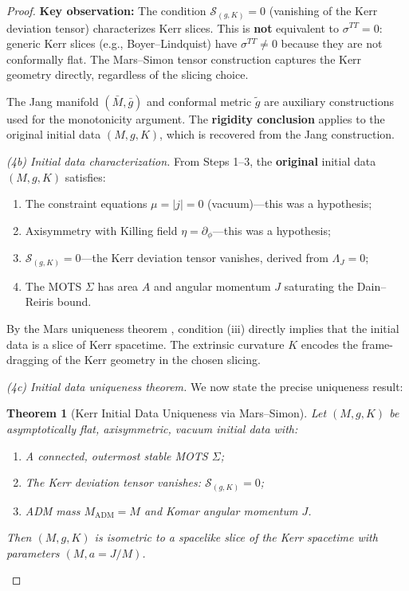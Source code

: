 \documentclass[12pt]{article}
\theoremstyle{plain}
\newtheorem{theorem}{Theorem}[section]
\theoremstyle{definition}
\theoremstyle{remark}
\newcommand{\ADM}{\mathrm{ADM}}
\newcommand{\tg}{\tilde{g}}
\newcommand{\bg}{\bar{g}}
\newcommand{\bM}{\bar{M}}
\begin{document}
\begin{proof}
\textbf{Key observation:} The condition $\mathcal{S}_{(g,K)} = 0$ (vanishing of the Kerr deviation tensor) characterizes Kerr slices. This is \textbf{not} equivalent to $\sigma^{TT} = 0$: generic Kerr slices (e.g., Boyer--Lindquist) have $\sigma^{TT} \neq 0$ because they are not conformally flat. The Mars--Simon tensor construction captures the Kerr geometry directly, regardless of the slicing choice.

The Jang manifold $(\bM, \bg)$ and conformal metric $\tg$ are auxiliary constructions used for the monotonicity argument. The \textbf{rigidity conclusion} applies to the original initial data $(M, g, K)$, which is recovered from the Jang construction.

\textit{(4b) Initial data characterization.} From Steps 1--3, the \textbf{original} initial data $(M, g, K)$ satisfies:
\begin{enumerate}
    \item[(i)] The constraint equations $\mu = |j| = 0$ (vacuum)---this was a hypothesis;
    \item[(ii)] Axisymmetry with Killing field $\eta = \partial_\phi$---this was a hypothesis;
    \item[(iii)] $\mathcal{S}_{(g,K)} = 0$---the Kerr deviation tensor vanishes, derived from $\Lambda_J = 0$;
    \item[(iv)] The MOTS $\Sigma$ has area $A$ and angular momentum $J$ saturating the Dain--Reiris bound.
\end{enumerate}

By the Mars uniqueness theorem \cite{mars2009}, condition (iii) directly implies that the initial data is a slice of Kerr spacetime. The extrinsic curvature $K$ encodes the frame-dragging of the Kerr geometry in the chosen slicing.

\textit{(4c) Initial data uniqueness theorem.} We now state the precise uniqueness result:

\begin{theorem}[Kerr Initial Data Uniqueness via Mars--Simon]\label{thm:CC}
Let $(M, g, K)$ be asymptotically flat, axisymmetric, vacuum initial data with:
\begin{enumerate}
    \item A connected, outermost stable MOTS $\Sigma$;
    \item The Kerr deviation tensor vanishes: $\mathcal{S}_{(g,K)} = 0$;
    \item ADM mass $M_{\ADM} = M$ and Komar angular momentum $J$.
\end{enumerate}
Then $(M, g, K)$ is isometric to a spacelike slice of the Kerr spacetime with parameters $(M, a = J/M)$.
\end{theorem}


\end{proof}
\end{document}
